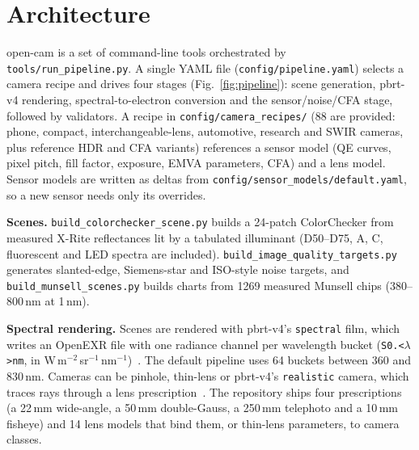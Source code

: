 \documentclass[letterpaper,twocolumn,fleqn]{article}
\begin{document}
\section{Architecture}
open-cam is a set of command-line tools orchestrated by \texttt{tools/run\_pipeline.py}. A single YAML file (\texttt{config/pipeline.yaml}) selects a camera recipe and drives four stages (Fig.~\ref{fig:pipeline}): scene generation, pbrt-v4 rendering, spectral-to-electron conversion and the sensor/noise/CFA stage, followed by validators. A recipe in \texttt{config/camera\_recipes/} (88 are provided: phone, compact, interchangeable-lens, automotive, research and SWIR cameras, plus reference HDR and CFA variants) references a sensor model (QE curves, pixel pitch, fill factor, exposure, EMVA parameters, CFA) and a lens model. Sensor models are written as deltas from \texttt{config/sensor\_models/default.yaml}, so a new sensor needs only its overrides.

\textbf{Scenes.} \texttt{build\_colorchecker\_scene.py} builds a 24-patch ColorChecker from measured X-Rite reflectances lit by a tabulated illuminant (D50--D75, A, C, fluorescent and LED spectra are included). \texttt{build\_image\_quality\_targets.py} generates slanted-edge, Siemens-star and ISO-style noise targets, and \texttt{build\_munsell\_scenes.py} builds charts from 1269 measured Munsell chips (380--800\,nm at 1\,nm).

\textbf{Spectral rendering.} Scenes are rendered with pbrt-v4's \texttt{spectral} film, which writes an OpenEXR file with one radiance channel per wavelength bucket (\texttt{S0.<}$\lambda$\texttt{>nm}, in W\,m$^{-2}$\,sr$^{-1}$\,nm$^{-1}$)~\cite{pbrtv4format}. The default pipeline uses 64 buckets between 360 and 830\,nm. Cameras can be pinhole, thin-lens or pbrt-v4's \texttt{realistic} camera, which traces rays through a lens prescription~\cite{kolb1995realistic}. The repository ships four prescriptions (a 22\,mm wide-angle, a 50\,mm double-Gauss, a 250\,mm telephoto and a 10\,mm fisheye) and 14 lens models that bind them, or thin-lens parameters, to camera classes.
\end{document}
